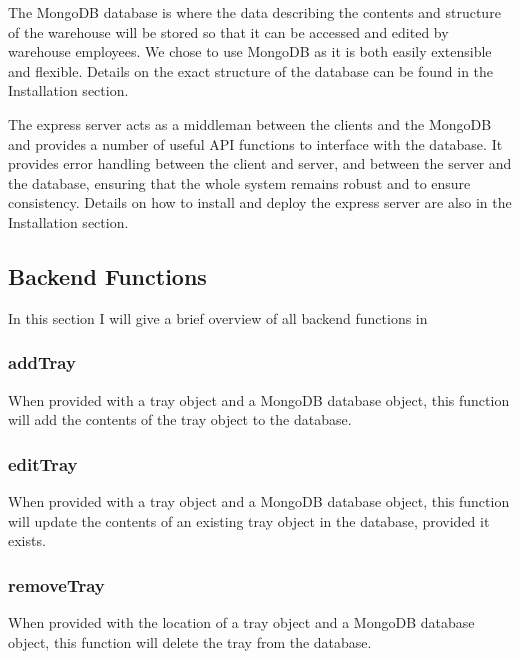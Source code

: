 \documentclass[letterpaper,10pt,english]{sphinxmanual}
\let\oldsubsection\subsection
\renewcommand{\subsection}{\needspace{6\baselineskip}\oldsubsection}
\begin{document}
The MongoDB database is where the data describing the contents and
structure of the warehouse will be stored so that it can be accessed and
edited by warehouse employees. We chose to use MongoDB as it is both
easily extensible and flexible. Details on the exact structure of the
database can be found in the Installation section.

The express server acts as a middle\sphinxhyphen{}man between the clients and the
MongoDB and provides a number of useful API functions to interface with
the database. It provides error handling between the client and server,
and between the server and the database, ensuring that the whole system
remains robust and to ensure consistency. Details on how to install and
deploy the express server are also in the Installation section.


\subsection{Back\sphinxhyphen{}end Functions}
\label{\detokenize{docs/System_Overview/Backend_overview:back-end-functions}}
In this section I will give a brief overview of all back\sphinxhyphen{}end functions
in 


\subsubsection{addTray}
\label{\detokenize{docs/System_Overview/Backend_overview:addtray}}
When provided with a tray object and a MongoDB database object, this
function will add the contents of the tray object to the database.


\subsubsection{editTray}
\label{\detokenize{docs/System_Overview/Backend_overview:edittray}}
When provided with a tray object and a MongoDB database object, this
function will update the contents of an existing tray object in the
database, provided it exists.


\subsubsection{removeTray}
\label{\detokenize{docs/System_Overview/Backend_overview:removetray}}
When provided with the location of a tray object and a MongoDB database
object, this function will delete the tray from the database.
\end{document}
